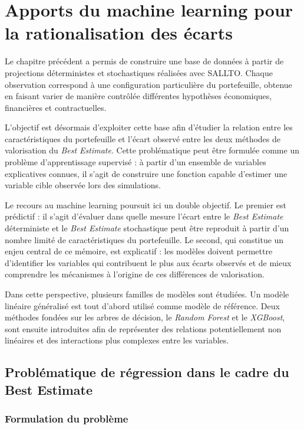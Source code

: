 \chapter{Apports du machine learning pour la rationalisation des écarts}

Le chapitre précédent a permis de construire une base de données à partir de projections déterministes et stochastiques réalisées avec SALLTO. Chaque observation correspond à une configuration particulière du portefeuille, obtenue en faisant varier de manière contrôlée différentes hypothèses économiques, financières et contractuelles.

L'objectif est désormais d'exploiter cette base afin d'étudier la relation entre les caractéristiques du portefeuille et l'écart observé entre les deux méthodes de valorisation du \textit{Best Estimate}. Cette problématique peut être formulée comme un problème d'apprentissage supervisé : à partir d'un ensemble de variables explicatives connues, il s'agit de construire une fonction capable d'estimer une variable cible observée lors des simulations.

Le recours au machine learning poursuit ici un double objectif. Le premier est prédictif : il s'agit d'évaluer dans quelle mesure l'écart entre le \textit{Best Estimate} déterministe et le \textit{Best Estimate} stochastique peut être reproduit à partir d'un nombre limité de caractéristiques du portefeuille. Le second, qui constitue un enjeu central de ce mémoire, est explicatif : les modèles doivent permettre d'identifier les variables qui contribuent le plus aux écarts observés et de mieux comprendre les mécanismes à l'origine de ces différences de valorisation.

Dans cette perspective, plusieurs familles de modèles sont étudiées. Un modèle linéaire généralisé est tout d'abord utilisé comme modèle de référence. Deux méthodes fondées sur les arbres de décision, le \textit{Random Forest} et le \textit{XGBoost}, sont ensuite introduites afin de représenter des relations potentiellement non linéaires et des interactions plus complexes entre les variables.


\section{Problématique de régression dans le cadre du Best Estimate}

\subsection{Formulation du problème}

